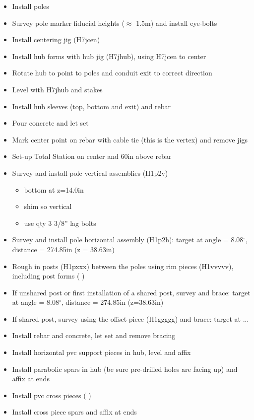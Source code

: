 \documentclass[11pt]{article}
\begin{document}
\renewcommand{\labelitemi}{$\boxempty$}
\renewcommand{\labelitemii}{$\boxempty$}
\begin{itemize}
\item Install poles
\item Survey pole marker fiducial heights ($\approx$ 1.5m) and install eye-bolts
\item Install centering jig (H7jcen)
\item Install hub forms with hub jig (H7jhub), using H7jcen to center
\item Rotate hub to point to poles and conduit exit to correct direction
\item Level with H7jhub and stakes
\item Install hub sleeves (top, bottom and exit) and rebar
\item Pour concrete and let set
\item Mark center point on rebar with cable tie (this is the vertex) and remove jigs
\item Set-up Total Station on center and 60in above rebar
\item Survey and install pole vertical assemblies (H1p2v)
	\begin{itemize}
	\item bottom at z=14.0in
	\item shim so vertical
	\item use qty 3 3/8'' lag bolts
	\end{itemize}
\item Survey and install pole horizontal assembly (H1p2h):  target at angle = 8.08$^\circ$, distance = 274.85in (z = 38.63in)
\item Rough in posts (H1pxxx) between the poles using rim pieces (H1vvvvv), including post forms (   )
\item If unshared post or first installation of a shared post, survey and brace:  target at angle = 8.08$^\circ$, distance = 274.85in (z=38.63in)
\item If shared post, survey using the offset piece (H1ggggg) and brace:  target at ...
\item Install rebar and concrete,  let set and remove bracing
\item Install horizontal pvc support pieces in hub, level and affix
\item Install parabolic spars in hub (be sure pre-drilled holes are facing up) and affix at ends
\item Install pvc cross pieces ( )
\item Install cross piece spars and affix at ends

\end{itemize}
\end{document}
